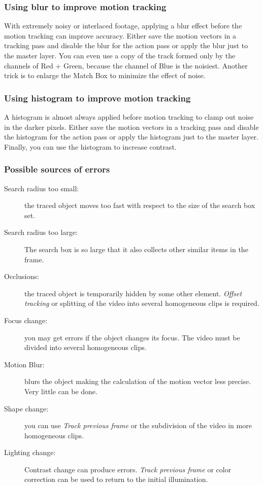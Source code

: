 \subsubsection*{Using blur to improve motion tracking}
\label{ssub:blur_improve_motion_tracking}

With extremely noisy or interlaced footage, applying a blur effect before the motion tracking can improve accuracy. Either save the motion vectors in a tracking pass and disable the blur for the action pass or apply the blur just to the master layer. You can even use a copy of the track formed only by the channels of Red + Green, because the channel of Blue is the noisiest. Another trick is to enlarge the Match Box to minimize the effect of noise.

\subsubsection*{Using histogram to improve motion tracking}
\label{ssub:histogram_improve_motion_tracking}

A histogram is almost always applied before motion tracking to clamp out noise in the darker pixels. Either save the motion vectors in a tracking pass and disable the histogram for the action pass or apply the histogram just to the master layer. Finally, you can use the histogram to increase contrast.

\subsubsection*{Possible sources of errors}
\label{ssub:possible_sources_errors}

\begin{description}
    \item[Search radius too small:] the traced object moves too fast with respect to the size of the search box set.
    \item[Search radius too large:] The search box is so large that it also collects other similar items in the frame.
    \item[Occlusions:] the traced object is temporarily hidden by some other element. \textit{Offset tracking} or splitting of the video into several homogeneous clips is required.
    \item[Focus change:] you may get errors if the object changes its focus. The video must be divided into several homogeneous clips.
    \item[Motion Blur:] blurs the object making the calculation of the motion vector less precise. Very little can be done.
    \item[Shape change:] you can use \textit{Track previous frame} or the subdivision of the video in more homogeneous clips.
    \item[Lighting change:] Contrast change can produce errors. \textit{Track previous frame} or color correction can be used to return to the initial illumination.
\end{description}

